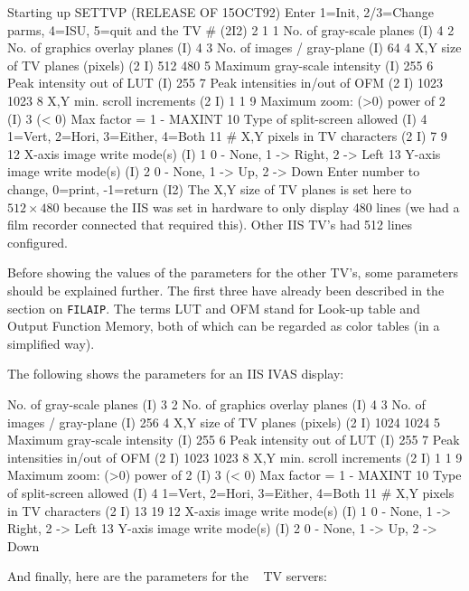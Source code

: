 \fortran
Starting up SETTVP (RELEASE OF 15OCT92)
Enter 1=Init, 2/3=Change parms, 4=ISU, 5=quit and the TV # (2I2)
2 1
1  No. of gray-scale planes         (I)     4
2  No. of graphics overlay planes   (I)     4
3  No. of images / gray-plane       (I)    64
4  X,Y size of TV planes (pixels) (2 I)   512   480
5  Maximum gray-scale intensity     (I)   255
6  Peak intensity out of LUT        (I)   255
7  Peak intensities in/out of OFM (2 I)  1023  1023
8  X,Y min. scroll increments     (2 I)     1     1
9  Maximum zoom: (>0) power of 2    (I)     3
      (< 0) Max factor = 1 - MAXINT
10 Type of split-screen allowed     (I)     4
      1=Vert, 2=Hori, 3=Either, 4=Both
11 # X,Y pixels in TV characters  (2 I)     7     9
12 X-axis image write mode(s)       (I)     1
      0 - None, 1 -> Right, 2 -> Left
13 Y-axis image write mode(s)       (I)     2
      0 - None, 1 -> Up, 2 -> Down
Enter number to change, 0=print, -1=return (I2)
\endfortran
\medskip\noindent
The X,Y size of TV planes is set here to $512 \times 480$ because the
IIS was set in hardware to only display 480 lines (we had a film recorder
connected that required this).  Other IIS TV's had 512 lines configured.

Before showing the values of the parameters for the other TV's, some
parameters should be explained further.  The first three have already
been described in the section on {\tt FILAIP}.  The terms LUT and OFM
stand for Look-up table and Output Function Memory, both of which can be
regarded as color tables (in a simplified way).

The following shows the parameters for an IIS IVAS display:\medskip

  No. of gray-scale planes         (I)     3
2  No. of graphics overlay planes   (I)     4
3  No. of images / gray-plane       (I)   256
4  X,Y size of TV planes (pixels) (2 I)  1024  1024
5  Maximum gray-scale intensity     (I)   255
6  Peak intensity out of LUT        (I)   255
7  Peak intensities in/out of OFM (2 I)  1023  1023
8  X,Y min. scroll increments     (2 I)     1     1
9  Maximum zoom: (>0) power of 2    (I)     3
      (< 0) Max factor = 1 - MAXINT
10 Type of split-screen allowed     (I)     4
      1=Vert, 2=Hori, 3=Either, 4=Both
11 # X,Y pixels in TV characters  (2 I)    13    19
12 X-axis image write mode(s)       (I)     1
      0 - None, 1 -> Right, 2 -> Left
13 Y-axis image write mode(s)       (I)     2
      0 - None, 1 -> Up, 2 -> Down
\endfortran

\medskip\noindent And finally, here are the parameters for the \AIPS~
TV servers:\medskip

